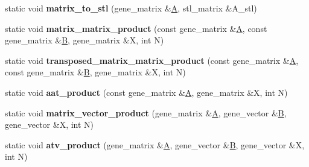 \begin{DoxyCompactItemize}
\item 
\mbox{\label{classmtl4__interface_aa17752486162687527baeb5187df9854}} 
static void {\bfseries matrix\+\_\+to\+\_\+stl} (gene\+\_\+matrix \&\hyperlink{group___core___module_class_eigen_1_1_matrix}{A}, stl\+\_\+matrix \&A\+\_\+stl)
\item 
\mbox{\label{classmtl4__interface_a57b8da25c43b877fd4e480d65dd97c09}} 
static void {\bfseries matrix\+\_\+matrix\+\_\+product} (const gene\+\_\+matrix \&\hyperlink{group___core___module_class_eigen_1_1_matrix}{A}, const gene\+\_\+matrix \&\hyperlink{group___core___module_class_eigen_1_1_matrix}{B}, gene\+\_\+matrix \&X, int N)
\item 
\mbox{\label{classmtl4__interface_a6a1fe4d2ffe7d5dba7ef6383f109eed5}} 
static void {\bfseries transposed\+\_\+matrix\+\_\+matrix\+\_\+product} (const gene\+\_\+matrix \&\hyperlink{group___core___module_class_eigen_1_1_matrix}{A}, const gene\+\_\+matrix \&\hyperlink{group___core___module_class_eigen_1_1_matrix}{B}, gene\+\_\+matrix \&X, int N)
\item 
\mbox{\label{classmtl4__interface_ab516084fc8d5460c76bcd987a782388d}} 
static void {\bfseries aat\+\_\+product} (const gene\+\_\+matrix \&\hyperlink{group___core___module_class_eigen_1_1_matrix}{A}, gene\+\_\+matrix \&X, int N)
\item 
\mbox{\label{classmtl4__interface_afdbeb5505a83d59bb5c0baa4d77d6d13}} 
static void {\bfseries matrix\+\_\+vector\+\_\+product} (gene\+\_\+matrix \&\hyperlink{group___core___module_class_eigen_1_1_matrix}{A}, gene\+\_\+vector \&\hyperlink{group___core___module_class_eigen_1_1_matrix}{B}, gene\+\_\+vector \&X, int N)
\item 
\mbox{\label{classmtl4__interface_abecd88134cb94d6428a21042cdf3fb5e}} 
static void {\bfseries atv\+\_\+product} (gene\+\_\+matrix \&\hyperlink{group___core___module_class_eigen_1_1_matrix}{A}, gene\+\_\+vector \&\hyperlink{group___core___module_class_eigen_1_1_matrix}{B}, gene\+\_\+vector \&X, int N)
\item 
\mbox{\label{classmtl4__interface_abbfa2f205b4636923dff7ae12d6c45b4}} 

\end{DoxyCompactItemize}

